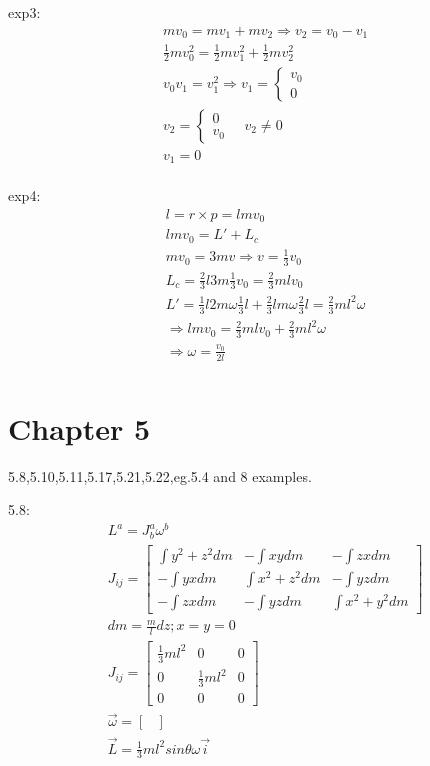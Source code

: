 \documentclass{article}
\begin{document}
exp3:
\begin{align*}
&mv_0=mv_1+mv_2\Rightarrow v_2=v_0-v_1 \\
&\frac12mv_0^2=\frac12mv_1^2+\frac12mv_2^2 \\
&v_0v_1=v_1^2\Rightarrow v_1=\begin{cases}v_0\\0\end{cases} \\
&v_2=\begin{cases}0\\v_0 \end{cases} \quad v_2\ne 0\\
&v_1=0 \\
\end{align*}

exp4:
\begin{align*}
&l=r\times p=l m v_0 \\
&lmv_0=L'+L_c \\
&mv_0=3mv\Rightarrow v=\frac13v_0 \\
&L_c=\frac23l 3m \frac13v_0=\frac23mlv_0 \\
&L'=\frac13l2m\omega \frac13l+\frac23lm\omega \frac23l=\frac23ml^2\omega \\
&\Rightarrow lmv_0=\frac23mlv_0+\frac23ml^2\omega \\
&\Rightarrow \omega=\frac{v_0}{2l} \\
\end{align*}

\section{Chapter 5}
5.8,5.10,5.11,5.17,5.21,5.22,eg.5.4 and 8 examples.

5.8:
\begin{align*}
&L^a=J^a_b\omega^b \\
&J_{ij}=\begin{bmatrix}
  \int y^2+z^2dm&-\int xy dm&-\int zx dm\\
  -\int yxdm&\int x^2+z^2 dm&-\int yzdm\\
  -\int zx dm&-\int yz dm&\int x^2+y^2 dm
\end{bmatrix}\\
&dm=\frac{m}ldz;x=y=0 \\
&J_{ij}=\begin{bmatrix}
  \frac13ml^2&0&0\\
  0&\frac13ml^2&0\\
  0&0&0
\end{bmatrix}\\
&\vec\omega=\begin{bmatrix}\end{bmatrix} \\
&\vec L=\frac13ml^2sin\theta \omega \vec i \\
\end{align*}
\end{document}
